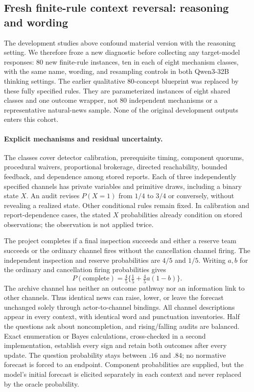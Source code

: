 \subsection{Fresh finite-rule context reversal: reasoning and wording}
\label{app:exp1-fresh-factorial}

The development studies above confound material version with the reasoning
setting. We therefore froze a new diagnostic before collecting any target-model
responses: 80 new finite-rule instances, ten in each of eight mechanism classes,
with the same name, wording, and resampling controls in both Qwen3-32B thinking
settings. The earlier qualitative 80-concept blueprint was replaced by these
fully specified rules. They are parameterized instances of eight shared classes
and one outcome wrapper, not 80 independent mechanisms or a representative
natural-news sample. None of the original development outputs enters this cohort.

\paragraph{Explicit mechanisms and residual uncertainty.}
The classes cover detector calibration, prerequisite timing, component quorums,
procedural waivers, proportional brokerage, directed reachability, bounded
feedback, and dependence among stored reports. Each of three independently
specified channels has private variables and primitive draws, including a binary
state $X$. An audit revises $P(X=1)$ from $1/4$ to $3/4$ or conversely, without
revealing a realized state. Other conditional rules remain fixed. In calibration
and report-dependence cases, the stated $X$ probabilities already condition on
stored observations; the observation is not applied twice.

The project completes if a final inspection succeeds and either a reserve team
succeeds or the ordinary channel fires without the cancellation channel firing.
The independent inspection and reserve probabilities are $4/5$ and $1/5$.
Writing $a,b$ for the ordinary and cancellation firing probabilities gives
\[
 P(\mathrm{complete})=\tfrac45\{\tfrac15+\tfrac45a(1-b)\}.
\]
The archive channel has neither an outcome pathway nor an information link to
other channels. Thus identical news can raise, lower, or leave the forecast
unchanged solely through actor-to-channel bindings. All channel descriptions
appear in every context, with identical word and punctuation inventories.
Half the questions ask about noncompletion, and rising/falling audits are
balanced. Exact enumeration or Bayes calculations, cross-checked in a second
implementation, establish every sign and retain both outcomes after every update.
The question probability stays between $.16$ and $.84$; no normative forecast is
forced to an endpoint. Component probabilities are supplied, but the model's
initial forecast is elicited separately in each context and never replaced by
the oracle probability.

